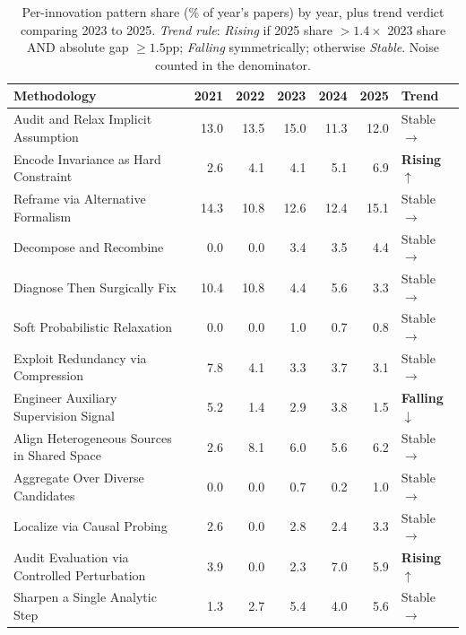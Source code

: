 \documentclass[10pt,a4paper]{article}
\begin{document}
\begin{table}[H]
\centering
\caption{Per-innovation pattern share (\% of year's papers) by year, plus trend verdict comparing 2023 to 2025. \emph{Trend rule}: \emph{Rising} if 2025 share $> 1.4 \times$ 2023 share AND absolute gap $\geq 1.5$pp; \emph{Falling} symmetrically; otherwise \emph{Stable}. Noise counted in the denominator.}
\label{tab:trend}
\small
\begin{tabular}{p{5.4cm} rrrrr l}
\toprule
\textbf{Methodology} & \textbf{2021} & \textbf{2022} & \textbf{2023} & \textbf{2024} & \textbf{2025} & \textbf{Trend} \\
\midrule
Audit and Relax Implicit Assumption & 13.0 & 13.5 & 15.0 & 11.3 & 12.0 & Stable $\to$ \\
Encode Invariance as Hard Constraint &  2.6 &  4.1 &  4.1 &  5.1 &  6.9 & \textbf{Rising $\uparrow$} \\
Reframe via Alternative Formalism & 14.3 & 10.8 & 12.6 & 12.4 & 15.1 & Stable $\to$ \\
Decompose and Recombine &  0.0 &  0.0 &  3.4 &  3.5 &  4.4 & Stable $\to$ \\
Diagnose Then Surgically Fix & 10.4 & 10.8 &  4.4 &  5.6 &  3.3 & Stable $\to$ \\
Soft Probabilistic Relaxation &  0.0 &  0.0 &  1.0 &  0.7 &  0.8 & Stable $\to$ \\
Exploit Redundancy via Compression &  7.8 &  4.1 &  3.3 &  3.7 &  3.1 & Stable $\to$ \\
Engineer Auxiliary Supervision Signal &  5.2 &  1.4 &  2.9 &  3.8 &  1.5 & \textbf{Falling $\downarrow$} \\
Align Heterogeneous Sources in Shared Space &  2.6 &  8.1 &  6.0 &  5.6 &  6.2 & Stable $\to$ \\
Aggregate Over Diverse Candidates &  0.0 &  0.0 &  0.7 &  0.2 &  1.0 & Stable $\to$ \\
Localize via Causal Probing &  2.6 &  0.0 &  2.8 &  2.4 &  3.3 & Stable $\to$ \\
Audit Evaluation via Controlled Perturbation &  3.9 &  0.0 &  2.3 &  7.0 &  5.9 & \textbf{Rising $\uparrow$} \\
Sharpen a Single Analytic Step &  1.3 &  2.7 &  5.4 &  4.0 &  5.6 & Stable $\to$ \\
\bottomrule
\end{tabular}
\end{table}
\end{document}
